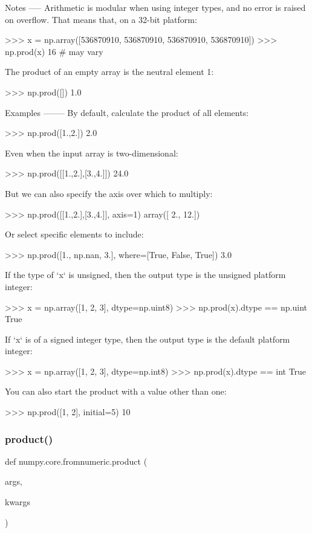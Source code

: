 \begin{DoxyVerb}
Notes
-----
Arithmetic is modular when using integer types, and no error is
raised on overflow.  That means that, on a 32-bit platform:

>>> x = np.array([536870910, 536870910, 536870910, 536870910])
>>> np.prod(x)
16 # may vary

The product of an empty array is the neutral element 1:

>>> np.prod([])
1.0

Examples
--------
By default, calculate the product of all elements:

>>> np.prod([1.,2.])
2.0

Even when the input array is two-dimensional:

>>> np.prod([[1.,2.],[3.,4.]])
24.0

But we can also specify the axis over which to multiply:

>>> np.prod([[1.,2.],[3.,4.]], axis=1)
array([  2.,  12.])

Or select specific elements to include:

>>> np.prod([1., np.nan, 3.], where=[True, False, True])
3.0

If the type of `x` is unsigned, then the output type is
the unsigned platform integer:

>>> x = np.array([1, 2, 3], dtype=np.uint8)
>>> np.prod(x).dtype == np.uint
True

If `x` is of a signed integer type, then the output type
is the default platform integer:

>>> x = np.array([1, 2, 3], dtype=np.int8)
>>> np.prod(x).dtype == int
True

You can also start the product with a value other than one:

>>> np.prod([1, 2], initial=5)
10
\end{DoxyVerb}
 \mbox{\label{namespacenumpy_1_1core_1_1fromnumeric_ac310d5de9912adf97d33010d490e278b}} 
\subsubsection{\texorpdfstring{product()}{product()}}
{\footnotesize\ttfamily def numpy.\+core.\+fromnumeric.\+product (\begin{DoxyParamCaption}\item[{}]{args,  }\item[{}]{kwargs }\end{DoxyParamCaption})}

